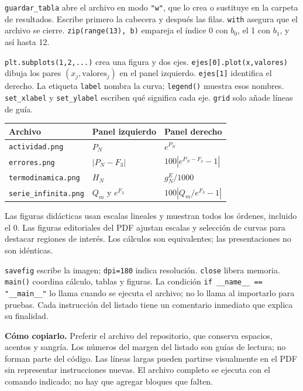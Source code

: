 \texttt{guardar\_tabla} abre el archivo en modo \texttt{"w"}, que lo crea o sustituye en la carpeta de resultados. Escribe primero la cabecera y después las filas. \texttt{with} asegura que el archivo se cierre. \texttt{zip(range(13), b)} empareja el índice 0 con $b_0$, el 1 con $b_1$, y así hasta 12.

\texttt{plt.subplots(1,2,...)} crea una figura y dos ejes. \texttt{ejes[0].plot(x,valores)} dibuja los pares $(x_j,\mathrm{valores}_j)$ en el panel izquierdo. \texttt{ejes[1]} identifica el derecho. La etiqueta \texttt{label} nombra la curva; \texttt{legend()} muestra esos nombres. \texttt{set\_xlabel} y \texttt{set\_ylabel} escriben qué significa cada eje. \texttt{grid} solo añade líneas de guía.

\begin{center}\small\begin{tabular}{lll}\toprule
Archivo & Panel izquierdo & Panel derecho\\\midrule
\texttt{actividad.png} & $P_N$ & $e^{P_N}$\\
\texttt{errores.png} & $|P_N-F_3|$ & $100|e^{P_N-F_3}-1|$\\
\texttt{termodinamica.png} & $H_N$ & $g_N^E/1000$\\
\texttt{serie\_infinita.png} & $Q_m$ y $e^{F_3}$ & $100|Q_m/e^{F_3}-1|$\\\bottomrule
\end{tabular}\end{center}
Las figuras didácticas usan escalas lineales y muestran todos los órdenes, incluido el 0. Las figuras editoriales del PDF ajustan escalas y selección de curvas para destacar regiones de interés. Los cálculos son equivalentes; las presentaciones no son idénticas.

\texttt{savefig} escribe la imagen; \texttt{dpi=180} indica resolución. \texttt{close} libera memoria. \texttt{main()} coordina cálculo, tablas y figuras. La condición \texttt{if \_\_name\_\_ == "\_\_main\_\_"} lo llama cuando se ejecuta el archivo; no lo llama al importarlo para pruebas. Cada instrucción del listado tiene un comentario inmediato que explica su finalidad.

\textbf{Cómo copiarlo.} Preferir el archivo del repositorio, que conserva espacios, acentos y sangría. Los números del margen del listado son guías de lectura; no forman parte del código. Las líneas largas pueden partirse visualmente en el PDF sin representar instrucciones nuevas. El archivo completo se ejecuta con el comando indicado; no hay que agregar bloques que falten.


